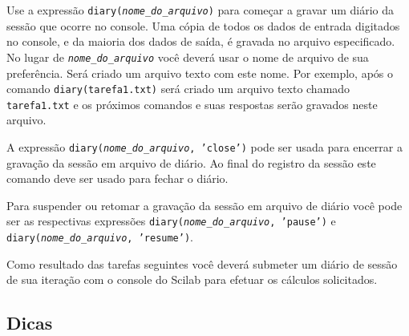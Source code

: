 \documentclass[11pt,fleqn]{practice}
\begin{document}
Use a expressão \texttt{diary(\textsl{nome\_do\_arquivo})} para começar
a gravar um diário da sessão que ocorre no console. Uma cópia de todos
os dados de entrada digitados no console, e da maioria dos dados de
saída, é gravada no arquivo especificado. No lugar de
\texttt{\textsl{nome\_do\_arquivo}} você deverá usar o nome de arquivo
de sua preferência. Será criado um arquivo texto com este nome. Por
exemplo, após o comando \texttt{diary(tarefa1.txt)} será criado um
arquivo texto chamado \texttt{tarefa1.txt} e os próximos comandos e suas
respostas serão gravados neste arquivo.

A expressão \texttt{diary(\textsl{nome\_do\_arquivo}, 'close')} pode ser
usada para encerrar a gravação da sessão em arquivo de diário. Ao final
do registro da sessão este comando deve ser usado para fechar o diário.

Para suspender ou retomar a gravação da sessão em arquivo de diário você
pode ser as respectivas expressões
\texttt{diary(\textsl{nome\_do\_arquivo}, 'pause')} e
\texttt{diary(\textsl{nome\_do\_arquivo}, 'resume')}.

Como resultado das tarefas seguintes você deverá submeter um diário de
sessão de sua iteração com o console do Scilab para efetuar os cálculos
solicitados.


\subsection{Dicas}
\end{document}
